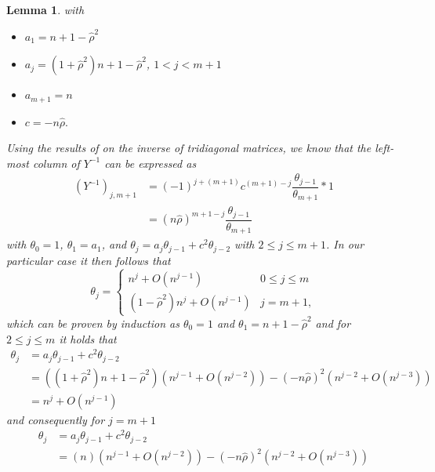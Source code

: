 \documentclass[11pt,dvipsnames]{article}
\newtheorem{lemma}{Lemma}
\begin{document}
\begin{appendices}
\begin{lemma}
with 
\begin{itemize}
\item $ a_{1}=n+1- \hat{\rho}^{2}$
\item $ a_{j}=(1+\hat{\rho}^{2})n+1- \hat{\rho}^{2}$, $ 1<j<m+1 $
\item $ a_{m+1}=n$
\item $ c=-n\hat{\rho}.$
\end{itemize}
Using the results of \citet{usmaniInversionTridiagonalJacobi1994} on the inverse of tridiagonal matrices, we know that the left-most column of $ Y ^{-1} $ can be expressed as 
\begin{equation}
\begin{split}
\left( Y ^{-1}\right) _{j,m+1}&=\left( -1\right) ^{j+(m+1)} c^{(m+1)-j} \dfrac{\theta_{j-1}}{\theta_{m+1}} * 1\\
&= \left( n\hat{\rho}\right) ^{m+1-j} \dfrac{\theta_{j-1}}{\theta_{m+1}}
\end{split}
\end{equation}
with $ \theta_{0}=1 $, $ \theta_{1}=a_{1}$, and $ \theta_{j}=a_{j}\theta_{j-1} + c^2 \theta_{j-2} $ with $ 2\leq j \leq m + 1 $. In our particular case it then follows that 
\begin{equation}
\theta_{j}=
\begin{cases}
n^{j}+O(n^{j-1}) & 0\leq j \leq m\\
(1-\hat{\rho}^{2})n^{j}+O(n^{j-1}) &j=m+1,
\end{cases}
\end{equation}
which can be proven by induction as $ \theta_{0}=1 $ and $ \theta_{1}=n+1-\hat{\rho}^{2} $ and for $ 2\leq j \leq m $ it holds that
\begin{equation}
\begin{split}
\theta_{j}&=a_{j}\theta_{j-1} + c^2 \theta_{j-2}\\
&=\left( (1+\hat{\rho}^{2})n+1- \hat{\rho}^{2}\right) \left( n^{j-1}+O(n^{j-2})\right) -  \left(-n\hat{\rho}  \right)^{2} \left( n^{j-2}+O(n^{j-3})\right)\\
&=n^{j}+O(n^{j-1})
\end{split}
\end{equation}
and consequently for $ j=m+1 $
\begin{equation}
\begin{split}
\theta_{j}&=a_{j}\theta_{j-1} + c^2 \theta_{j-2}\\
&=\left( n\right) \left( n^{j-1}+O(n^{j-2})\right) -  \left(-n\hat{\rho}  \right)^{2} \left( n^{j-2}+O(n^{j-3})\right)\\

\end{split}
\end{equation}
\end{lemma}
\end{appendices}
\end{document}
